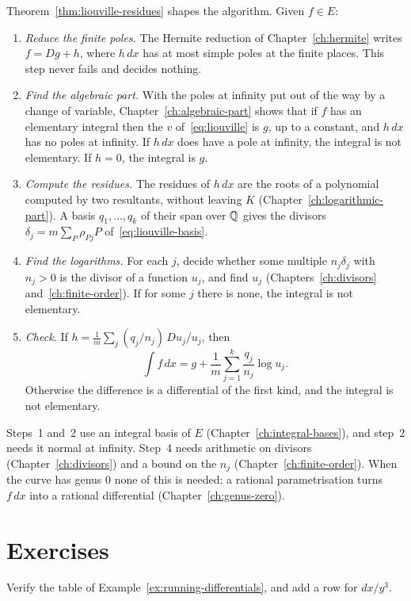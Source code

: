 Theorem~\ref{thm:liouville-residues} shapes the algorithm. Given $f \in E$:
\begin{enumerate}
\item \emph{Reduce the finite poles.} The Hermite reduction of
  Chapter~\ref{ch:hermite} writes $f = Dg + h$, where $h\,dx$ has at most
  simple poles at the finite places. This step never fails and decides
  nothing.
\item \emph{Find the algebraic part.} With the poles at infinity put out of
  the way by a change of variable, Chapter~\ref{ch:algebraic-part} shows
  that if $f$ has an elementary integral then the $v$
  of~\eqref{eq:liouville} is $g$, up to a constant, and $h\,dx$ has no poles
  at infinity. If $h\,dx$ does have a pole at infinity, the integral is not
  elementary. If $h = 0$, the integral is $g$.
\item \emph{Compute the residues.} The residues of $h\,dx$ are the roots of
  a polynomial computed by two resultants, without leaving $K$
  (Chapter~\ref{ch:logarithmic-part}). A basis $q_1, \dots, q_k$ of their span
  over $\mathbb{Q}$ gives the divisors $\delta_j = m \sum_P \rho_{Pj} P$
  of~\eqref{eq:liouville-basis}.
\item \emph{Find the logarithms.} For each $j$, decide whether some multiple
  $n_j \delta_j$ with $n_j > 0$ is the divisor of a function $u_j$, and find
  $u_j$ (Chapters~\ref{ch:divisors} and~\ref{ch:finite-order}). If for some
  $j$ there is none, the integral is not elementary.
\item \emph{Check.} If $h = \frac1m \sum_j (q_j / n_j)\, Du_j / u_j$, then
  \[
    \int f\,dx = g + \frac{1}{m} \sum_{j=1}^k \frac{q_j}{n_j} \log u_j .
  \]
  Otherwise the difference is a differential of the first kind, and the
  integral is not elementary.
\end{enumerate}
Steps~1 and~2 use an integral basis of $E$ (Chapter~\ref{ch:integral-bases}),
and step~2 needs it normal at infinity. Step~4 needs arithmetic on divisors
(Chapter~\ref{ch:divisors}) and a bound on the $n_j$
(Chapter~\ref{ch:finite-order}). When the curve has genus $0$ none of this
is needed: a rational parametrisation turns $f\,dx$ into a rational
differential (Chapter~\ref{ch:genus-zero}).

\section*{Exercises}

\begin{exercise}
Verify the table of Example~\ref{ex:running-differentials}, and add a row for
$dx/y^3$.
\end{exercise}

